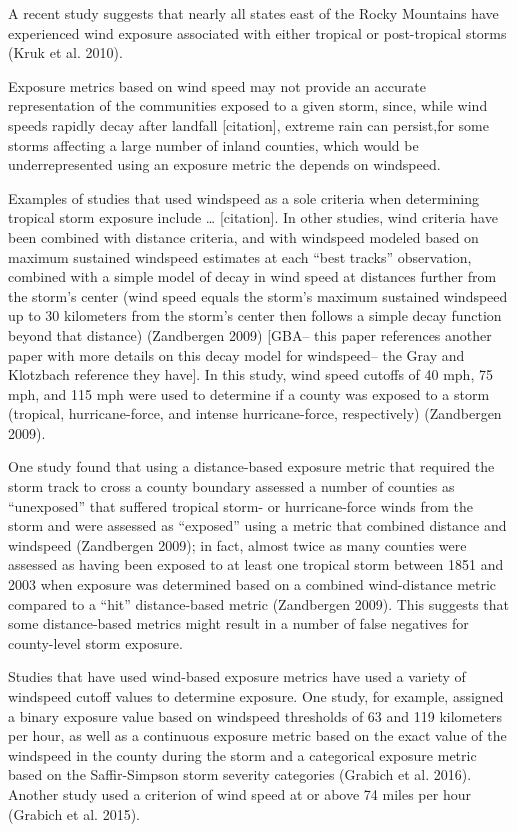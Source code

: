 \documentclass[]{elsarticle} %
\begin{document}
A recent study suggests that nearly all states east of the Rocky
Mountains have experienced wind exposure associated with either tropical
or post-tropical storms (Kruk et al. 2010).

Exposure metrics based on wind speed may not provide an accurate
representation of the communities exposed to a given storm, since, while
wind speeds rapidly decay after landfall {[}citation{]}, extreme rain
can persist,for some storms affecting a large number of inland counties,
which would be underrepresented using an exposure metric the depends on
windspeed.

Examples of studies that used windspeed as a sole criteria when
determining tropical storm exposure include \ldots{} {[}citation{]}. In
other studies, wind criteria have been combined with distance criteria,
and with windspeed modeled based on maximum sustained windspeed
estimates at each ``best tracks'' observation, combined with a simple
model of decay in wind speed at distances further from the storm's
center (wind speed equals the storm's maximum sustained windspeed up to
30 kilometers from the storm's center then follows a simple decay
function beyond that distance) (Zandbergen 2009) {[}GBA-- this paper
references another paper with more details on this decay model for
windspeed-- the Gray and Klotzbach reference they have{]}. In this
study, wind speed cutoffs of 40 mph, 75 mph, and 115 mph were used to
determine if a county was exposed to a storm (tropical, hurricane-force,
and intense hurricane-force, respectively) (Zandbergen 2009).

One study found that using a distance-based exposure metric that
required the storm track to cross a county boundary assessed a number of
counties as ``unexposed'' that suffered tropical storm- or
hurricane-force winds from the storm and were assessed as ``exposed''
using a metric that combined distance and windspeed (Zandbergen 2009);
in fact, almost twice as many counties were assessed as having been
exposed to at least one tropical storm between 1851 and 2003 when
exposure was determined based on a combined wind-distance metric
compared to a ``hit'' distance-based metric (Zandbergen 2009). This
suggests that some distance-based metrics might result in a number of
false negatives for county-level storm exposure.

Studies that have used wind-based exposure metrics have used a variety
of windspeed cutoff values to determine exposure. One study, for
example, assigned a binary exposure value based on windspeed thresholds
of 63 and 119 kilometers per hour, as well as a continuous exposure
metric based on the exact value of the windspeed in the county during
the storm and a categorical exposure metric based on the Saffir-Simpson
storm severity categories (Grabich et al. 2016). Another study used a
criterion of wind speed at or above 74 miles per hour (Grabich et al.
2015).
\end{document}
